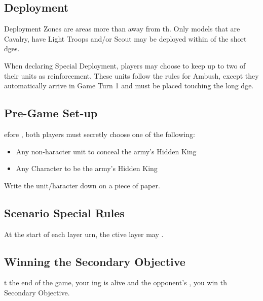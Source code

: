 
\label{TheHiddenKings}


\subsection*{Deployment}

Deployment Zones are areas more than  away from th. Only models that are Cavalry, have Light Troops and/or Scout may be deployed within  of the short dges.

When declaring Special Deployment, players may choose to keep up to two of their units as reinforcement. These units follow the rules for Ambush, except  they automatically arrive in Game Turn 1\rewordedrule{,} and must be placed touching the  long dge.


\subsection*{Pre-Game Set-up}

efore , both players must secretly choose one of the following:

\begin{itemize}
\item Any  non-haracter unit to conceal the army's Hidden King
\item Any  Character to be the army's Hidden King
\end{itemize}

Write the  unit/haracter down on a piece of paper.

\subsection*{Scenario Special Rules}

At the start of each layer urn, the ctive layer may .

\subsection*{Winning the Secondary Objective}

t the end of the game,  your ing is alive and the opponent's , you win th Secondary Objective.
